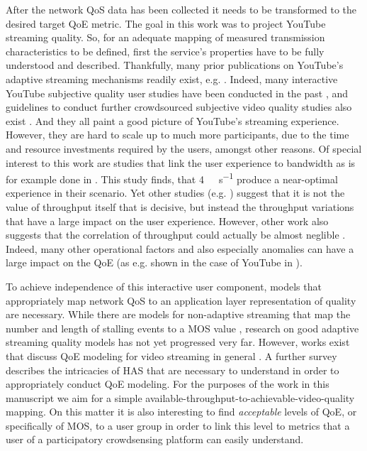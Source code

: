 After the network \gls{QoS} data has been collected it needs to be transformed to the desired target \gls{QoE} metric. The goal in this work was to project YouTube streaming quality. So, for an adequate mapping of measured transmission characteristics to be defined, first the service's properties have to be fully understood and described. Thankfully, many prior publications on YouTube's adaptive streaming mechanisms readily exist, e.g. \cite{7810251,7497231}. Indeed, many interactive YouTube subjective quality user studies have been conducted in the past \cite{7194076,Nam:2014:YPA:2619239.2631433}, and guidelines to conduct further crowdsourced subjective video quality studies also exist \cite{7148150}. And they all paint a good picture of YouTube's streaming experience. However, they are hard to scale up to much more participants, due to the time and resource investments required by the users, amongst other reasons. Of special interest to this work are studies that link the user experience to bandwidth as is for example done in \cite{Casas:2015:EQC:2785971.2785978}. This study finds, that \SI{4}{\mega\bit\per\second} produce a near-optimal experience in their scenario. Yet other studies (e.g. \cite{7247426}) suggest that it is not the value of throughput itself that is decisive, but instead the throughput variations that have a large impact on the user experience. However, other work also suggests that the correlation of throughput could actually be almost neglible \cite{7562672}. Indeed, many other operational factors and also especially anomalies can have a large impact on the \gls{QoE} (as e.g. shown in the case of YouTube in \cite{6975242}).

To achieve independence of this interactive user component, models that appropriately map network \gls{QoS} to an application layer representation of quality are necessary. While there are models for non-adaptive streaming that map the number and length of stalling events to a \gls{MOS} value \cite{Hossfeld2013}, research on good adaptive streaming quality models has not yet progressed very far. However, works exist that discuss \gls{QoE} modeling for video streaming in general \cite{7148138}. A further survey \cite{6913491} describes the intricacies of \gls{HAS} that are necessary to understand in order to appropriately conduct \gls{QoE} modeling. For the purposes of the work in this manuscript we aim for a simple available-throughput-to-achievable-video-quality mapping. On this matter it is also interesting to find \textit{acceptable} levels of \gls{QoE}, or specifically of \gls{MOS}, to a user group in order to link this level to metrics that a user of a participatory crowdsensing platform can easily understand.

